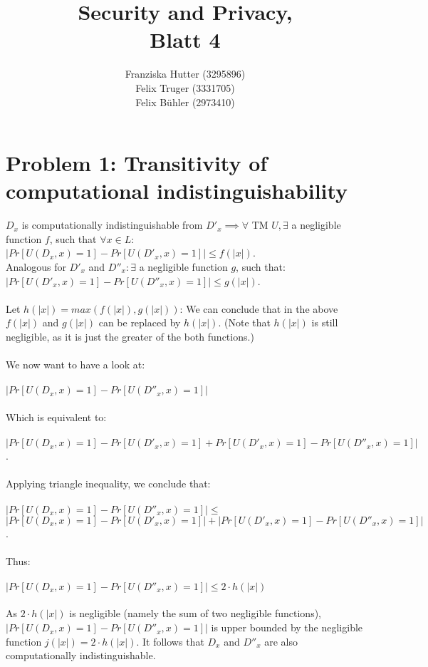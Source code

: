 \documentclass[12pt,pdftex,a4paper]{article}
\title{Security and Privacy,\\ Blatt 4}
\author{Franziska Hutter (3295896)\\
	Felix Truger (3331705)\\
	Felix Bühler (2973410)}
\begin{document}
\maketitle
\pagebreak

\section*{Problem 1: Transitivity of computational indistinguishability}


$D_x$ is computationally indistinguishable from $D'_x \implies \forall$ TM $U, \exists$ a negligible function $f$, such that $\forall x\in L:$\\$|Pr[U(D_x, x)=1]-Pr[U(D'_x, x)=1]|\leq f(|x|)$.\\
Analogous for $D'_x$ and $D''_x: \exists$ a negligible function $g$, such that:\\
$|Pr[U(D'_x, x)=1]-Pr[U(D''_x, x)=1]|\leq g(|x|)$.\\~\\
Let $h(|x|)=max(f(|x|), g(|x|))$: We can conclude that in the above $f(|x|)$ and $g(|x|)$ can be replaced by $h(|x|)$. (Note that $h(|x|)$ is still negligible, as it is just the greater of the both functions.)
\\~\\
We now want to have a look at:\\~\\
$|Pr[U(D_x, x)=1]-Pr[U(D''_x, x)=1]|$
\\~\\
Which is equivalent to:
\\~\\
$|Pr[U(D_x, x)=1]-Pr[U(D'_x, x)=1] + Pr[U(D'_x, x)=1]-Pr[U(D''_x, x)=1]|$.
\\~\\
Applying triangle inequality, we conclude that:
\\~\\
$|Pr[U(D_x, x)=1]-Pr[U(D''_x, x)=1]| \leq$ $|Pr[U(D_x, x)=1]-Pr[U(D'_x, x)=1]| + |Pr[U(D'_x, x)=1]-Pr[U(D''_x, x)=1]|$.
\\~\\
Thus:
\\~\\
$|Pr[U(D_x, x)=1]-Pr[U(D''_x, x)=1]| \leq 2\cdot h(|x|)$
\\~\\
As $2\cdot h(|x|)$ is negligible (namely the sum of two negligible functions), $|Pr[U(D_x, x)=1]-Pr[U(D''_x, x)=1]|$ is upper bounded by the negligible function $j(|x|)=2\cdot h(|x|)$. It follows that $D_x$ and $D''_x$ are also computationally indistinguishable.
\end{document}
